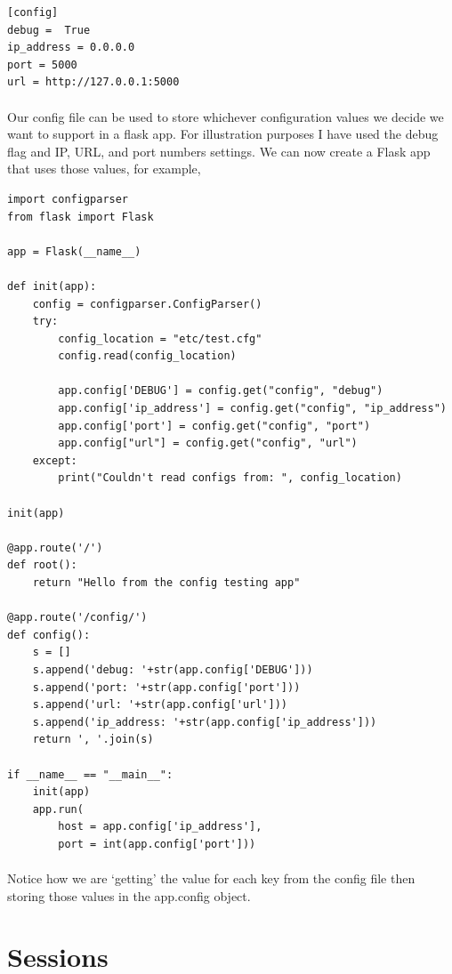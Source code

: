\documentclass[12pt, a4paper, oneside]{book}
\begin{document}
\begin{lstlisting}
[config]
debug =  True
ip_address = 0.0.0.0
port = 5000
url = http://127.0.0.1:5000
\end{lstlisting}

\paragraph{} Our config file can be used to store whichever configuration values we decide we want to support in a flask app. For illustration purposes I have used the debug flag and IP, URL, and port numbers settings. We can now create a Flask app that uses those values, for example,

\begin{lstlisting}
import configparser
from flask import Flask

app = Flask(__name__)

def init(app):
    config = configparser.ConfigParser()
    try:
        config_location = "etc/test.cfg"
        config.read(config_location)

        app.config['DEBUG'] = config.get("config", "debug")
        app.config['ip_address'] = config.get("config", "ip_address")
        app.config['port'] = config.get("config", "port")
        app.config["url"] = config.get("config", "url")
    except:
        print("Couldn't read configs from: ", config_location)

init(app)

@app.route('/')
def root():
    return "Hello from the config testing app"

@app.route('/config/')
def config():
    s = []
    s.append('debug: '+str(app.config['DEBUG']))
    s.append('port: '+str(app.config['port']))
    s.append('url: '+str(app.config['url']))
    s.append('ip_address: '+str(app.config['ip_address']))
    return ', '.join(s)

if __name__ == "__main__":
    init(app)
    app.run(
        host = app.config['ip_address'],
        port = int(app.config['port']))
\end{lstlisting}

\paragraph{}  Notice how we are `getting' the value for each key from the config file then storing those values in the app.config object. 

\section{Sessions}
\label{sessions}
\end{document}
